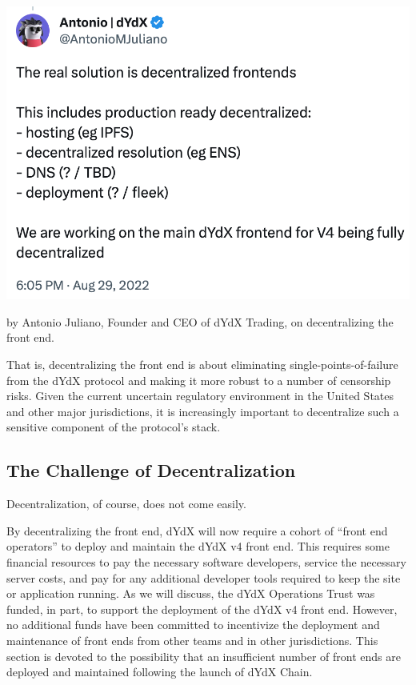     \begin{marginfigure}
        \centering
        \includegraphics[width=\linewidth]{figs/feip_tweet.png}
        \captionsetup{width=\linewidth}
        \caption{ by Antonio Juliano, Founder and CEO of dYdX Trading, on decentralizing the front end.}
        \label{fig:feip_tweet}
    \end{marginfigure}

    That is, decentralizing the front end is about eliminating single-points-of-failure from the dYdX protocol and making it more robust to a number of censorship risks. Given the current uncertain regulatory environment in the United States and other major jurisdictions, it is increasingly important to decentralize such a sensitive component of the protocol's stack.

    \subsection{The Challenge of Decentralization}

        Decentralization, of course, does not come easily.

        By decentralizing the front end, dYdX will now require a cohort of ``front end operators'' to deploy and maintain the dYdX v4 front end. This requires some financial resources to pay the necessary software developers, service the necessary server costs, and pay for any additional developer tools required to keep the site or application running. As we will discuss, the dYdX Operations Trust was funded, in part, to support the deployment of the dYdX v4 front end. However, no additional funds have been committed to incentivize the deployment and maintenance of front ends from other teams and in other jurisdictions. This section is devoted to the possibility that an insufficient number of front ends are deployed and maintained following the launch of dYdX Chain. 
    
